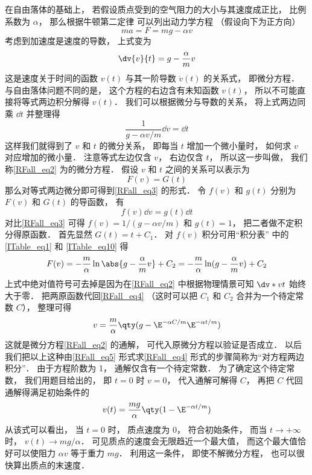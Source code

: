 

在自由落体的基础上， 若假设质点受到的空气阻力的大小与其速度成正比， 比例系数为 $\alpha$， 那么根据牛顿第二定律 可以列出动力学方程 （假设向下为正方向）
\begin{equation}
ma = F = mg - \alpha v
\end{equation}
考虑到加速度是速度的导数， 上式变为
\begin{equation}\label{RFall_eq2}
\dv{v}{t} = g - \frac{\alpha}{m} v
\end{equation}
这是速度关于时间的函数 $v(t)$ 与其一阶导数 $\dot v(t)$ 的关系式， 即微分方程． 与自由落体问题不同的是， 这个方程的右边含有未知函数 $v(t)$， 所以不可能直接将等式两边积分解得 $v(t)$． 我们可以根据微分与导数的关系， 将上式两边同乘 $\dd{t}$ 并整理得
\begin{equation}\label{RFall_eq3}
\frac{1}{g - \alpha v/m} \dd{v} = \dd{t}
\end{equation}
这样我们就得到了 $v$ 和 $t$ 的微分关系， 即每当 $t$ 增加一个微小量时， 如何求 $v$ 对应增加的微小量． 注意等式左边仅含 $v$， 右边仅含 $t$， 所以这一步叫做， 我们称\autoref{RFall_eq2} 为的微分方程． 假设 $v$ 和 $t$ 之间的关系可以表示为
\begin{equation}\label{RFall_eq4}
F(v) = G(t)
\end{equation}
那么对等式两边微分即可得到\autoref{RFall_eq3} 的形式． 令 $f(v)$ 和 $g(t)$ 分别为 $F(v)$ 和 $G(t)$ 的导函数， 有
\begin{equation}\label{RFall_eq5}
f(v) \dd{v} = g(t) \dd{t}
\end{equation}
对比\autoref{RFall_eq3} 可得 $f(v) = 1/(g - \alpha v/m)$ 和 $g(t) = 1$， 把二者做不定积分得原函数． 首先显然 $G(t) = t + C_1$． 对 $f(v)$ 积分可用“积分表” 中的\autoref{ITable_eq1} 和 \autoref{ITable_eq10} 得
\begin{equation}
F(v) = -\frac{m}{\alpha} \ln\abs{g - \frac{\alpha}{m} v} + C_2 = -\frac{m}{\alpha} \ln(g - \frac{\alpha}{m} v) + C_2
\end{equation}
 上式中绝对值符号可去掉是因为在\autoref{RFall_eq2} 中根据物理情景可知 $\dv*{v}{t}$ 始终大于零． 把两原函数代回\autoref{RFall_eq4} （这时可以把 $C_1$ 和 $C_2$ 合并为一个待定常数 $C$）， 整理可得
\begin{equation}
v = \frac{m}{\alpha} \qty( g - \E^{-\alpha C/m} \E^{-\alpha t/m} )
\end{equation}
这就是微分方程\autoref{RFall_eq2} 的通解， 可代入原微分方程以验证是否成立． 以后我们把以上这种由\autoref{RFall_eq5} 形式求\autoref{RFall_eq4} 形式的步骤简称为“对方程两边积分”． 由于方程阶数为 1， 通解仅含有一个待定常数． 为了确定这个待定常数， 我们用题目给出的， 即 $t = 0$ 时 $v = 0$， 代入通解可解得 $C$， 再把 $C$ 代回通解得满足初始条件的
\begin{equation}
v(t) = \frac{mg}{\alpha} \qty( 1- \E^{-\alpha t/m} )
\end{equation}
从该式可以看出， 当 $t = 0$ 时， 质点速度为 0， 符合初始条件， 而当 $t\to +\infty$ 时， $ v(t) \to mg/\alpha$． 可见质点的速度会无限趋近一个最大值， 而这个最大值恰好可以使阻力 $\alpha v$ 等于重力 $mg$． 利用这一条件， 即使不解微分方程， 也可以很快算出质点的末速度．

